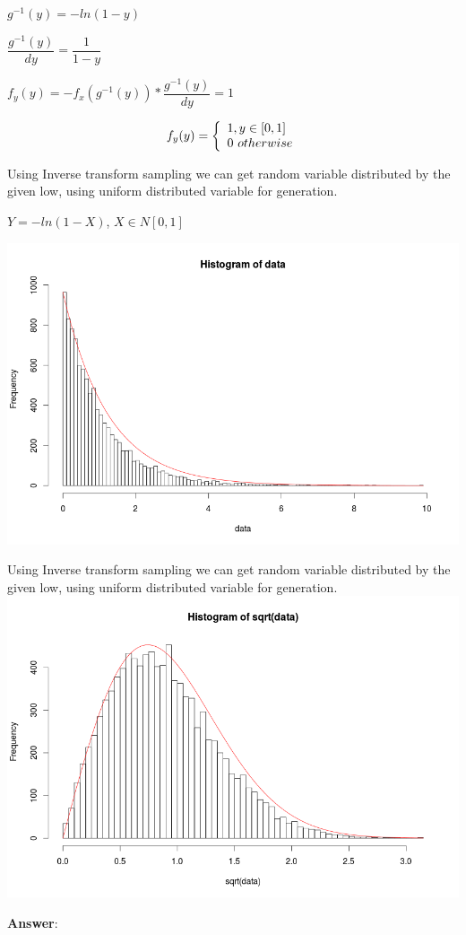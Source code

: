 \documentclass[12pt]{article}
\theoremstyle{definiton}
\theoremstyle{definition}
\theoremstyle{definition}
\begin{document}
\begin{list}{) ~}{}
		$g^{-1}(y) = - ln(1 - y)$


		$\dfrac{g^{-1}(y)}{dy} = \dfrac{1}{1-y}$

		$f_y(y) = - f_x(g^{-1}(y)) * \dfrac{g^{-1}(y)}{dy} = 1$

\[f_y(y) = \left\{
\begin{array}{l l}
  1, y \in [0,1]\\
  0\ otherwise
\end{array} \right.\]

		\item Using Inverse transform sampling we can get random variable distributed by the given low, using uniform distributed variable for generation.

$Y = - ln(1 - X)$, $X \in N[0,1]$

\includegraphics[width=1\textwidth]{Rplot.png}

		\item Using Inverse transform sampling we can get random variable distributed by the given low, using uniform distributed variable for generation.
		{\includegraphics[width=1\textwidth]{Rplot01.png}}

\end{list}
		\medskip
		\textbf{Answer}:
\end{document}
